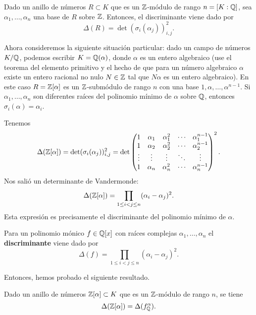 \begin{proposicion}
  Dado un anillo de números $R \subset K$ que es un $\mathbb{Z}$-módulo de rango
  $n = [K : \mathbb{Q}]$, sea $\alpha_1, \ldots, \alpha_n$ una base de $R$ sobre
  $\mathbb{Z}$. Entonces, el discriminante viene dado por
  $$\Delta (R) = \det (\sigma_i (\alpha_j))_{i,j}^2.$$
\end{proposicion}

Ahora consideremos la siguiente situación particular: dado un campo de números
$K/\mathbb{Q}$, podemos escribir $K = \mathbb{Q} (\alpha)$, donde $\alpha$ es un entero
algebraico (use el teorema del elemento primitivo y el hecho de que para un
número algebraico $\alpha$ existe un entero racional no nulo $N \in \mathbb{Z}$ tal que
$N\alpha$ es un entero algebraico). En este caso $R = \mathbb{Z} [\alpha]$ es un
$\mathbb{Z}$-submódulo de rango $n$ con una base $1, \alpha, \ldots, \alpha^{n-1}$.
Si $\alpha_1, \ldots, \alpha_n$ son diferentes raíces del polinomio mínimo
de $\alpha$ sobre $\mathbb{Q}$, entonces $\sigma_i (\alpha) = \alpha_i$.

Tenemos
\[ \Delta (\mathbb{Z} [\alpha]) = \det (\sigma_i (\alpha_j))_{i,j}^2 =
   \det \begin{pmatrix}
     1 & \alpha_1 & \alpha_1^2 & \cdots & \alpha_1^{n-1} \\
     1 & \alpha_2 & \alpha_2^2 & \cdots & \alpha_2^{n-1} \\
     \vdots & \vdots & \vdots & \ddots & \vdots \\
     1 & \alpha_n & \alpha_n^2 & \cdots & \alpha_n^{n-1} \\
   \end{pmatrix}^2. \]
Nos salió un determinante de Vandermonde:
$$\Delta (\mathbb{Z} [\alpha]) = \prod_{1 \le i < j \le n} (\alpha_i - \alpha_j)^2.$$
Esta expresión es precisamente el discriminante del polinomio mínimo de
$\alpha$.

\begin{definicion}
  Para un polinomio mónico $f \in \mathbb{Q} [x]$ con raíces complejas
  $\alpha_1, \ldots, \alpha_n$ el \textbf{discriminante} viene dado por
  $$\Delta (f) = \prod_{1 \le i < j \le n} (\alpha_i - \alpha_j)^2.$$
\end{definicion}

Entonces, hemos probado el siguiente resultado.

\begin{proposicion}
  Dado un anillo de números $\mathbb{Z} [\alpha] \subset K$ que es un $\mathbb{Z}$-módulo
  de rango $n$, se tiene
  $$\Delta (\mathbb{Z} [\alpha]) = \Delta (f^\alpha_{\mathbb{Q}}).$$
\end{proposicion}

